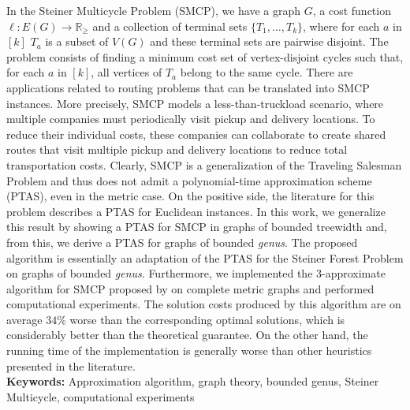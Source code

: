 
In the Steiner Multicycle Problem (SMCP), we have a graph \(G\), a cost function $\ell \colon E(G) \to \mathbb{R}_\ge$ and a collection of terminal sets \(\{T_1, \dots , T_k\}\), where for each \(a\) in \([k]\) \(T_a\) is a subset of \(V(G)\) and these terminal sets are pairwise disjoint. The problem consists of finding a minimum cost set of vertex-disjoint cycles such that, for each \(a\) in \([k]\), all vertices of \(T_a\) belong to the same cycle.
There are applications related to routing problems that can be translated into SMCP instances.
More precisely, SMCP models a less-than-truckload scenario, where multiple companies must periodically visit pickup and delivery locations.
To reduce their individual costs, these companies can collaborate to create shared routes that visit multiple pickup and delivery locations to reduce total transportation costs.
Clearly, SMCP is a generalization of the Traveling Salesman Problem and thus does not admit a polynomial-time approximation scheme (PTAS), even in the metric case.
On the positive side, the literature for this problem describes a PTAS for Euclidean instances. In this work, we generalize this result by showing a PTAS for SMCP in graphs of bounded treewidth and, from this, we derive a PTAS for graphs of bounded \textit{genus}.
The proposed algorithm is essentially an adaptation of the PTAS for the Steiner Forest Problem on graphs of bounded \textit{genus}.
Furthermore, we implemented the 3-approximate algorithm for SMCP proposed by \cite{smcp_3apx} on complete metric graphs and performed computational experiments.
The solution costs produced by this algorithm are on average \(34\%\) worse than the corresponding optimal solutions, which is considerably better than the theoretical guarantee.
On the other hand, the running time of the implementation is generally worse than other heuristics presented in the literature.
\hfill\\

\noindent\textbf{Keywords:} Approximation algorithm, graph theory, bounded genus, Steiner Multicycle, computational experiments
